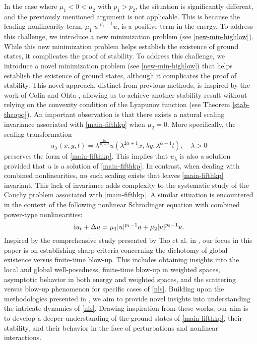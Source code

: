 \documentclass[10pt]{article}
\numberwithin{equation}{section}
\newcommand{\ii}{{\rm i}}
\newcommand{\lam}{\lambda}
\newcommand{\mo}{\mu_1}  \newcommand{\po}{{p_1}}
\newcommand{\moo}{\mu_2}  \newcommand{\poo}{{p_2}}
\newcommand{\al}{\alpha}
\begin{document}
In the case where $\mo < 0 < \moo$ with $\po > \poo$, the situation is significantly different, and the previously mentioned argument is not applicable. This is because the leading nonlinearity term, $\mo |u|^{\po-1}u$, is a positive term in the energy. To address this challenge, we introduce a new minimization problem (see \eqref{new-min-highlow}). While this new minimization problem helps establish the existence of ground states, it complicates the proof of stability. To address this challenge, we introduce a novel minimization problem (see \eqref{new-min-highlow}) that helps establish the existence of ground states, although it complicates the proof of stability. This novel approach, distinct from previous methods, is inspired by the work of Colin and Ohta \cite{colin}, allowing us to achieve another stability result without relying on the convexity condition of the Lyapunov function (see Theorem \ref{stab-theopq}).
		An important observation is that there exists a natural scaling invariance associated with \eqref{main-fifthkp} when $\mu_2=0$. More specifically, the scaling transformation
	\begin{equation}\label{scaling}
		u_\lam(x,y,t)=\lam^{\frac{2\al}{p_1-1}}u(\lam^{2\al+1}x,\lam y,\lam^{\al+1}t),\quad\lam>0
	\end{equation}
	preserves the form of \eqref{main-fifthkp}. This implies that $u_\lam$ is also a solution provided that $u$ is a solution of \eqref{main-fifthkp}. In contrast, when dealing with combined nonlinearities, no such scaling exists that leaves \eqref{main-fifthkp} invariant. This lack of invariance adds complexity to the systematic study of the Cauchy problem associated with \eqref{main-fifthkp}. A similar situation is encountered in the context of the following nonlinear Schrödinger equation with combined power-type nonlinearities:
	\begin{equation}\label{nls}
		\ii u_t+\Delta u=\mu_1 |u|^{p_1-1}u+\mu_2|u|^{p_2-1}u.
	\end{equation}
	Inspired by the comprehensive study presented by Tao et al. in \cite{tvs}, our focus in this paper is on establishing sharp criteria concerning the dichotomy of global existence versus finite-time blow-up. This includes obtaining insights into the local and global well-posedness, finite-time blow-up in weighted spaces, asymptotic behavior in both energy and weighted spaces, and the scattering versus blow-up phenomenon for specific cases of \eqref{nls}. Building upon the methodologies presented in \cite{cmz,mzz}, we aim to provide novel insights into understanding the intricate dynamics of \eqref{nls}. Drawing inspiration from these works, our aim is to develop a deeper understanding of the ground states of \eqref{main-fifthkp}, their stability, and their behavior in the face of perturbations and nonlinear interactions.
	
\end{document}
